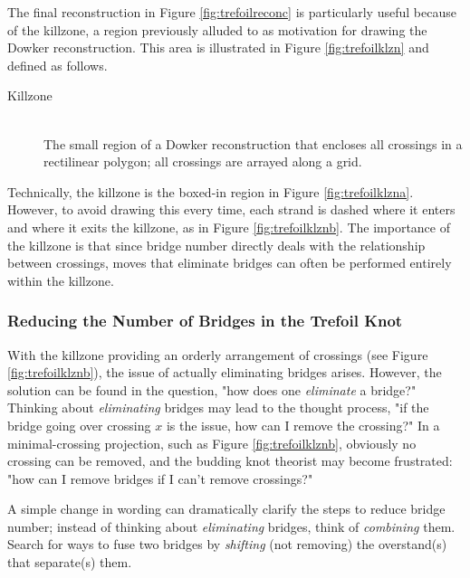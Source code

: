 \documentclass[titlepage]{article}
\begin{document}
The final reconstruction in Figure \ref{fig:trefoilreconc} is particularly useful because of the killzone, a region previously alluded to as motivation for drawing the Dowker reconstruction. This area is illustrated in Figure \ref{fig:trefoilklzn} and defined as follows.\par

\begin{defi}
    \begin{description}
        \item[Killzone] \hfill \\ The small region of a Dowker reconstruction that encloses all crossings in a rectilinear polygon; all crossings are arrayed along a grid.
    \end{description}
\end{defi}

Technically, the killzone is the boxed-in region in Figure \ref{fig:trefoilklzna}. However, to avoid drawing this every time, each strand is dashed where it enters and where it exits the killzone, as in Figure \ref{fig:trefoilklznb}. The importance of the killzone is that since bridge number directly deals with the relationship between crossings, moves that eliminate bridges can often be performed entirely within the killzone.


\subsubsection{Reducing the Number of Bridges in the Trefoil Knot}\label{ss2:trefoilreduce}
With the killzone providing an orderly arrangement of crossings (see Figure \ref{fig:trefoilklznb}), the issue of actually eliminating bridges arises. However, the solution can be found in the question, "how does one \emph{eliminate} a bridge?" Thinking about \emph{eliminating} bridges may lead to the thought process, "if the bridge going over crossing $x$ is the issue, how can I remove the crossing?" In a minimal-crossing projection, such as Figure \ref{fig:trefoilklznb}, obviously no crossing can be removed, and the budding knot theorist may become frustrated: "how can I remove bridges if I can't remove crossings?"\par
A simple change in wording can dramatically clarify the steps to reduce bridge number; instead of thinking about \emph{eliminating} bridges, think of \emph{combining} them. Search for ways to fuse two bridges by \emph{shifting} (not removing) the overstand(s) that separate(s) them.\par
\end{document}

